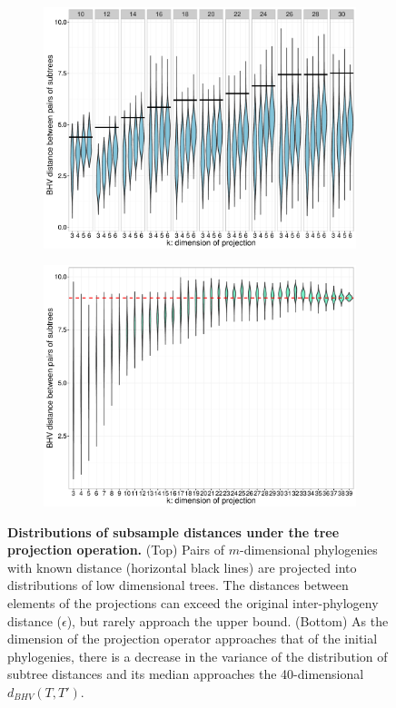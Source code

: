 \documentclass[a4paper,11pt]{article}
\begin{document}
\begin{figure}
    \begin{subfigure}{\linewidth}
    \centering
    \includegraphics[width=0.8\linewidth]{../figures/dimred_pwdist_vs_K.pdf}
    \end{subfigure}
    
    \begin{subfigure}{\linewidth}
    \centering
    \includegraphics[width=0.8\linewidth]{../figures/dimred_pwdist_m40_vs_K.pdf}
    \end{subfigure}

    \caption{{\bf Distributions of subsample distances under the tree projection operation.} (Top) Pairs of $m$-dimensional phylogenies with known distance (horizontal black lines) are projected into distributions of low dimensional trees. The distances between elements of the projections can exceed the original inter-phylogeny distance ($\epsilon$), but rarely approach the upper bound. (Bottom) As the dimension of the projection operator approaches that of the initial phylogenies, there is a decrease in the variance of the distribution of subtree distances and its median approaches the 40-dimensional $d_{BHV}(T, T')$.}
    \label{fig:dimred_calibration}
\end{figure}
\end{document}
